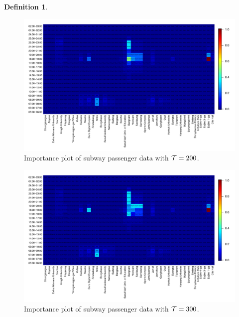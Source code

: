 \documentclass[preprint, review, 12pt]{article}
\theoremstyle{definition}
\newtheorem{dfn}{Definition}
\theoremstyle{remark}
\begin{document}
\begin{dfn}
\begin{figure}
	\centering
	\includegraphics[width=1.05\textwidth]{Fig/In_scale_3.pdf}
	\vspace{-13mm}
	\caption{Importance plot of subway passenger data with ${\cal T}=200$.}
	\label{snow:subway_in_2}
\end{figure}

\begin{figure}
	\centering
	\includegraphics[width=1.05\textwidth]{Fig/In_scale_4.pdf}
	\vspace{-13mm}
	\caption{Importance plot of subway passenger data with ${\cal T}=300$.}
	\label{snow:subway_in_3}
\end{figure}


\end{dfn}
\end{document}
